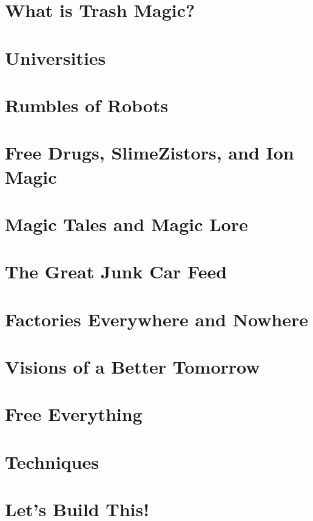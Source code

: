 \documentclass[ebook,12pt,openany]{memoir} %
\begin{document}
\chapter{What is Trash Magic?}


\chapter{Universities}


\chapter{Rumbles of Robots}


\chapter{Free Drugs, SlimeZistors, and Ion Magic}


\chapter{Magic Tales and Magic Lore}


\chapter{The Great Junk Car Feed}


\chapter{Factories Everywhere and Nowhere}


\chapter{Visions of a Better Tomorrow}


\chapter{Free Everything}


\chapter{Techniques}


\chapter{Let's Build This!}

\end{document}
